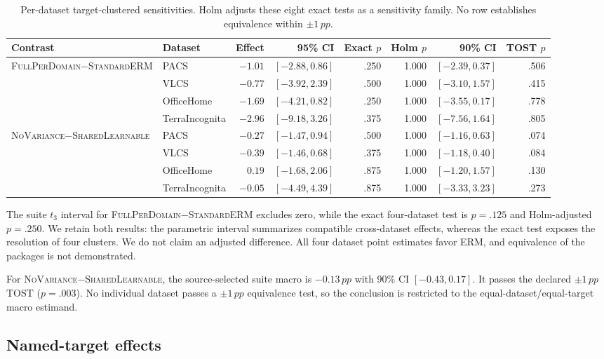 \documentclass[10pt]{article}
\newcommand{\pp}{\,pp}
\newcommand{\full}{\textsc{FullPerDomain}}
\newcommand{\erm}{\textsc{StandardERM}}
\newcommand{\shared}{\textsc{SharedLearnable}}
\newcommand{\novar}{\textsc{NoVariance}}
\begin{document}
\begin{table}[H]
\centering
\caption{Per-dataset target-clustered sensitivities. Holm adjusts these eight
exact tests as a sensitivity family. No row establishes equivalence within
$\pm1\pp$.}
\label{tab:primary-datasets}
\scriptsize
\setlength{\tabcolsep}{3.5pt}
\begin{tabular}{llrrrrrr}
\toprule
Contrast & Dataset & Effect & 95\% CI & Exact $p$ & Holm $p$ & 90\% CI & TOST $p$ \\
\midrule
\full{}$-$\erm{} & PACS & $-1.01$ & $[-2.88,0.86]$ & .250 & 1.000 & $[-2.39,0.37]$ & .506 \\
 & VLCS & $-0.77$ & $[-3.92,2.39]$ & .500 & 1.000 & $[-3.10,1.57]$ & .415 \\
 & OfficeHome & $-1.69$ & $[-4.21,0.82]$ & .250 & 1.000 & $[-3.55,0.17]$ & .778 \\
 & TerraIncognita & $-2.96$ & $[-9.18,3.26]$ & .375 & 1.000 & $[-7.56,1.64]$ & .805 \\
\midrule
\novar{}$-$\shared{} & PACS & $-0.27$ & $[-1.47,0.94]$ & .500 & 1.000 & $[-1.16,0.63]$ & .074 \\
 & VLCS & $-0.39$ & $[-1.46,0.68]$ & .375 & 1.000 & $[-1.18,0.40]$ & .084 \\
 & OfficeHome & $0.19$ & $[-1.68,2.06]$ & .875 & 1.000 & $[-1.20,1.57]$ & .130 \\
 & TerraIncognita & $-0.05$ & $[-4.49,4.39]$ & .875 & 1.000 & $[-3.33,3.23]$ & .273 \\
\bottomrule
\end{tabular}
\end{table}

The suite $t_3$ interval for \full{}$-$\erm{} excludes zero, while the exact
four-dataset test is $p=.125$ and Holm-adjusted $p=.250$. We retain both
results: the parametric interval summarizes compatible cross-dataset effects,
whereas the exact test exposes the resolution of four clusters. We do not
claim an adjusted difference. All four dataset point estimates favor ERM, and
equivalence of the packages is not demonstrated.

For \novar{}$-$\shared{}, the source-selected suite macro is $-0.13\pp$ with 90\%
CI $[-0.43,0.17]$. It passes the declared $\pm1\pp$ TOST ($p=.003$). No
individual dataset passes a $\pm1\pp$ equivalence test, so the conclusion is
restricted to the equal-dataset/equal-target macro estimand.

\subsection{Named-target effects}
\end{document}
